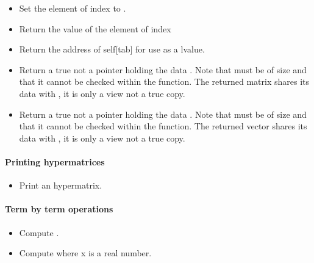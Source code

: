 \begin{itemize}
\item   {}
  \sshortdescribe Set the element of index  to .
  
\item {}
  \sshortdescribe Return the value of the element of index  
  
\item {}
  \sshortdescribe Return the address of self[tab] for use as a lvalue.  

\item {}
  \sshortdescribe Return a true \PnlMat not a pointer holding the data
  . Note that  must be of size  and that it
  cannot be checked within the function. The returned matrix shares its data
  with , it is only a view not a true copy.

\item {}
  \sshortdescribe Return a true \PnlVect not a pointer holding the data
  . Note that  must be of size  and that it
  cannot be checked within the function. The returned vector shares its data
  with , it is only a view not a true copy.


\end{itemize}  

\paragraph{Printing hypermatrices}

\begin{itemize}
\item {}
  \sshortdescribe Print an hypermatrix.
\end{itemize}

\paragraph{Term by term operations}

\begin{itemize}
\item {}
  \sshortdescribe Compute .
  
\item {}
  \sshortdescribe Compute  where x is a real number.
\end{itemize}

